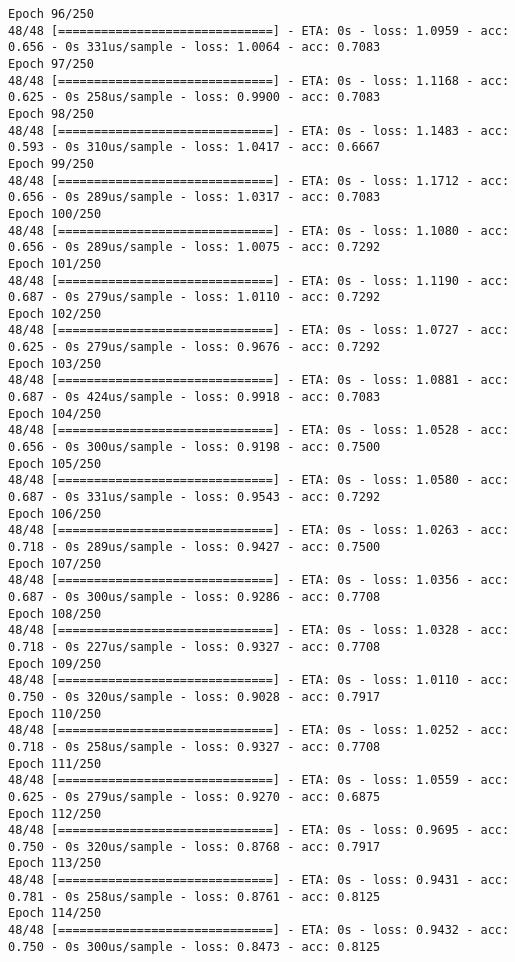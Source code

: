 \documentclass[11pt]{article}
\begin{document}
\begin{Verbatim}[commandchars=\\\{\}]
Epoch 96/250
48/48 [==============================] - ETA: 0s - loss: 1.0959 - acc: 0.656 - 0s 331us/sample - loss: 1.0064 - acc: 0.7083
Epoch 97/250
48/48 [==============================] - ETA: 0s - loss: 1.1168 - acc: 0.625 - 0s 258us/sample - loss: 0.9900 - acc: 0.7083
Epoch 98/250
48/48 [==============================] - ETA: 0s - loss: 1.1483 - acc: 0.593 - 0s 310us/sample - loss: 1.0417 - acc: 0.6667
Epoch 99/250
48/48 [==============================] - ETA: 0s - loss: 1.1712 - acc: 0.656 - 0s 289us/sample - loss: 1.0317 - acc: 0.7083
Epoch 100/250
48/48 [==============================] - ETA: 0s - loss: 1.1080 - acc: 0.656 - 0s 289us/sample - loss: 1.0075 - acc: 0.7292
Epoch 101/250
48/48 [==============================] - ETA: 0s - loss: 1.1190 - acc: 0.687 - 0s 279us/sample - loss: 1.0110 - acc: 0.7292
Epoch 102/250
48/48 [==============================] - ETA: 0s - loss: 1.0727 - acc: 0.625 - 0s 279us/sample - loss: 0.9676 - acc: 0.7292
Epoch 103/250
48/48 [==============================] - ETA: 0s - loss: 1.0881 - acc: 0.687 - 0s 424us/sample - loss: 0.9918 - acc: 0.7083
Epoch 104/250
48/48 [==============================] - ETA: 0s - loss: 1.0528 - acc: 0.656 - 0s 300us/sample - loss: 0.9198 - acc: 0.7500
Epoch 105/250
48/48 [==============================] - ETA: 0s - loss: 1.0580 - acc: 0.687 - 0s 331us/sample - loss: 0.9543 - acc: 0.7292
Epoch 106/250
48/48 [==============================] - ETA: 0s - loss: 1.0263 - acc: 0.718 - 0s 289us/sample - loss: 0.9427 - acc: 0.7500
Epoch 107/250
48/48 [==============================] - ETA: 0s - loss: 1.0356 - acc: 0.687 - 0s 300us/sample - loss: 0.9286 - acc: 0.7708
Epoch 108/250
48/48 [==============================] - ETA: 0s - loss: 1.0328 - acc: 0.718 - 0s 227us/sample - loss: 0.9327 - acc: 0.7708
Epoch 109/250
48/48 [==============================] - ETA: 0s - loss: 1.0110 - acc: 0.750 - 0s 320us/sample - loss: 0.9028 - acc: 0.7917
Epoch 110/250
48/48 [==============================] - ETA: 0s - loss: 1.0252 - acc: 0.718 - 0s 258us/sample - loss: 0.9327 - acc: 0.7708
Epoch 111/250
48/48 [==============================] - ETA: 0s - loss: 1.0559 - acc: 0.625 - 0s 279us/sample - loss: 0.9270 - acc: 0.6875
Epoch 112/250
48/48 [==============================] - ETA: 0s - loss: 0.9695 - acc: 0.750 - 0s 320us/sample - loss: 0.8768 - acc: 0.7917
Epoch 113/250
48/48 [==============================] - ETA: 0s - loss: 0.9431 - acc: 0.781 - 0s 258us/sample - loss: 0.8761 - acc: 0.8125
Epoch 114/250
48/48 [==============================] - ETA: 0s - loss: 0.9432 - acc: 0.750 - 0s 300us/sample - loss: 0.8473 - acc: 0.8125

\end{Verbatim}
\end{document}
